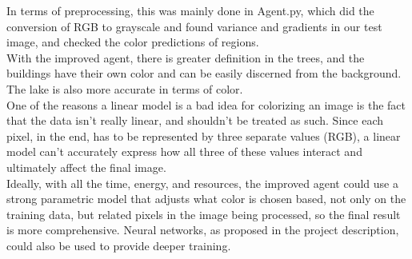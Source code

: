 \documentclass[12pt]{report}
\begin{document}
In terms of preprocessing, this was mainly done in Agent.py, which did the conversion of RGB to grayscale and found variance and gradients in our test image, and checked the color predictions of regions.\\
With the improved agent, there is greater definition in the trees, and the buildings have their own color and can be easily discerned from the background. The lake is also more accurate in terms of color.\\
One of the reasons a linear model is a bad idea for colorizing an image is the fact that the data isn't really linear, and shouldn't be treated as such. Since each pixel, in the end, has to be represented by three separate values (RGB), a linear model can't accurately express how all three of these values interact and ultimately affect the final image.\\
Ideally, with all the time, energy, and resources, the improved agent could use a strong parametric model that adjusts what color is chosen based, not only on the training data, but related pixels in the image being processed, so the final result is more comprehensive. Neural networks, as proposed in the project description, could also be used to provide deeper training.
\end{document}
